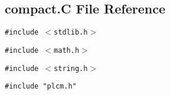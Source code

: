 \subsection{compact.C File Reference}
\label{compact.C}
{\tt \#include $<$stdlib.h$>$}\par
{\tt \#include $<$math.h$>$}\par
{\tt \#include $<$string.h$>$}\par
{\tt \#include "plcm.h"}\par
